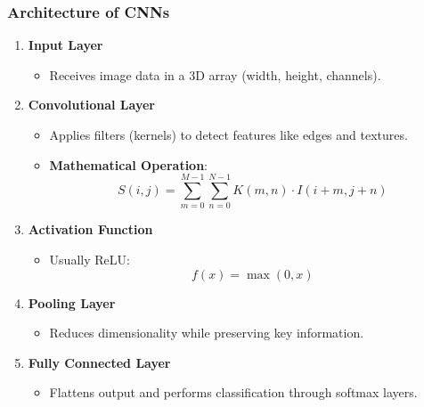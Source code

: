 \documentclass[aspectratio=169]{beamer}
\begin{document}
\begin{frame}[fragile]
    \frametitle{Architecture of CNNs}
    \begin{enumerate}
        \item \textbf{Input Layer}
        \begin{itemize}
            \item Receives image data in a 3D array (width, height, channels).
        \end{itemize}
        
        \item \textbf{Convolutional Layer}
        \begin{itemize}
            \item Applies filters (kernels) to detect features like edges and textures.
            \item \textbf{Mathematical Operation}:
            \begin{equation}
            S(i,j) = \sum_{m=0}^{M-1} \sum_{n=0}^{N-1} K(m,n) \cdot I(i+m,j+n)
            \end{equation}
        \end{itemize}

        \item \textbf{Activation Function}
        \begin{itemize}
            \item Usually ReLU: 
            \begin{equation}
            f(x) = \max(0,x)
            \end{equation}
        \end{itemize}

        \item \textbf{Pooling Layer}
        \begin{itemize}
            \item Reduces dimensionality while preserving key information.
        \end{itemize}

        \item \textbf{Fully Connected Layer}
        \begin{itemize}
            \item Flattens output and performs classification through softmax layers.
        \end{itemize}
    \end{enumerate}
\end{frame}
\end{document}
